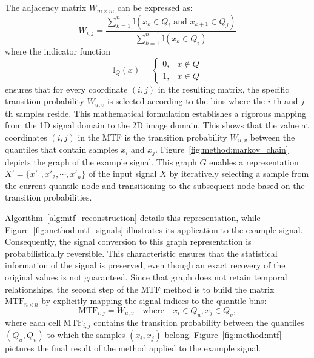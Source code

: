 \documentclass[final,3p,times,twocolumn]{elsarticle}
\begin{document}
The adjacency matrix $W_{m \times m}$ can be expressed as:  
\begin{equation}
    W_{i,j} = \frac{
    \sum\limits_{k=1}^{n-1} \mathbb{I}(x_k \in Q_i \text{ and } x_{k+1} \in Q_j)
    }{
    \sum\limits_{k=1}^{n-1} \mathbb{I}(x_k \in Q_i)
    }
\end{equation}
where the indicator function
\begin{equation}
    \mathbb{I}_Q(x) = \begin{cases}
        0, & x \not\in Q \\
        1, & x \in Q
    \end{cases}
\end{equation}
ensures that for every coordinate $(i, j)$ in the resulting matrix, the specific transition probability $W_{u,v}$ is selected according to the bins where the $i$-th and $j$-th samples reside. This mathematical formulation establishes a rigorous mapping from the 1D signal domain to the 2D image domain.
This shows that the value at coordinates $(i, j)$ in the \gls{MTF} is the transition probability $W_{u,v}$ between the quantiles that contain samples $x_i$ and $x_j$.
Figure~\ref{fig:method:markov_chain} depicts the graph of the example signal. This graph $G$ enables a representation  $X' = \{ x'_1,x'_2,\cdots,x'_n \}$  of the input signal $X$ by iteratively selecting a sample from the current quantile node and transitioning to the subsequent node based on the transition probabilities.

Algorithm~\ref{alg:mtf_reconstruction} details this representation, while Figure~\ref{fig:method:mtf_signals} illustrates its application to the example signal. Consequently, the signal conversion to this graph representation is probabilistically reversible. This characteristic ensures that the statistical information of the signal is preserved, even though an exact recovery of the original values is not guaranteed.
Since that graph does not retain temporal relationships, the second step of the \gls{MTF} method is to build the matrix $\text{MTF}_{n \times n}$ by explicitly mapping the signal indices to the quantile bins:
\begin{equation}
    \text{MTF}_{i,j} = W_{u,v} \quad \text{where} \quad x_i \in Q_u, x_j \in Q_v,
\end{equation}
where each cell $\text{MTF}_{i,j}$ contains the transition probability between the quantiles $(Q_u,Q_v)$ to which the samples $(x_i,x_j)$ belong.
Figure~\ref{fig:method:mtf} pictures the final result of the method applied to the example signal. 
\end{document}

